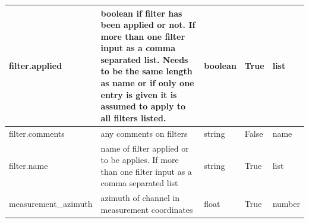 \documentclass[12pt]{article}
\begin{document}
\begin{table}[h!]
\begin{tabular}{|l|p{2.75in}|l|l|p{.95in}|}
	filter.applied & boolean if filter has been applied or not. If more than one filter input as a comma separated list.  Needs to be the same length as name or if only one entry is given it is assumed to apply to all filters listed. & boolean & True & list \\ \hline
	filter.comments & any comments on filters & string & False & name \\ \hline
	filter.name & name of filter applied or to be applies. If more than one filter input as a comma separated list & string & True & list \\ \hline
	measurement\_azimuth & azimuth of channel in measurement coordinates & float & True & number \\ \hline
    
    \end{tabular}
    \label{tab:electric01}
\end{table}    
\end{document}
